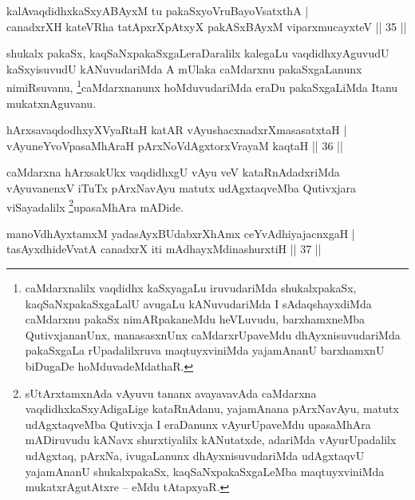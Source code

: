 
\begin{shl}
kalAvaqdidhxkaSxyABAyxM tu pakaSxyoVruBayoVsatxthA |\\
canadxrXH kateVRha tatApxrXpAtxyX pakASxBAyxM viparxmucayxteV \hfill || 35 ||
\end{shl}

\begin{artha}
shukalx pakaSx, kaqSaNxpakaSxgaLeraDaralilx kalegaLu vaqdidhxyAguvudU kaSxyisuvudU kANuvudariMda A mUlaka caMdarxnu pakaSxgaLanunx nimiRsuvanu, \footnote[1]{caMdarxnalilx vaqdidhx kaSxyagaLu iruvudariMda shukalxpakaSx, kaqSaNxpakaSxgaLalU avugaLu kANuvudariMda I sAdaqshayxdiMda caMdarxnu pakaSx nimARpakaneMdu heVLuvudu, barxhamxneMba QutivxjananUnx, manasasxnUnx caMdarxrUpaveMdu dhAyxnisuvudariMda pakaSxgaLa rUpadalilxruva maqtuyxviniMda yajamAnanU barxhamxnU biDugaDe hoMduvadeMdathaR.}caMdarxnanunx hoMduvudariMda eraDu pakaSxgaLiMda Itanu mukatxnAguvanu.
\end{artha}


\begin{shl}
hArxsavaqdodhxyXVyaRtaH katAR vAyushacxnadxrXmasasatxtaH |\\
vAyuneYvoVpasaMhAraH pArxNoVdAgxtorxVrayaM kaqtaH \hfill || 36 ||
\end{shl}

\begin{artha}
caMdarxna hArxsakUkx vaqdidhxgU vAyu veV kataRnAdadxriMda vAyuvanenxV iTuTx pArxNavAyu matutx udAgxtaqveMba Qutivxjara viSayadalilx \footnote[2]{sUtArxtamxnAda vAyuvu tananx avayavavAda caMdarxna vaqdidhxkaSxyAdigaLige kataRnAdanu, yajamAnana pArxNavAyu, matutx udAgxtaqveMba Qutivxja I eraDanunx vAyurUpaveMdu upasaMhAra mADiruvudu kANavx shurxtiyalilx kANutatxde, adariMda vAyurUpadalilx udAgxtaq, pArxNa, ivugaLanunx dhAyxnisuvudariMda udAgxtaqvU yajamAnanU shukalxpakaSx, kaqSaNxpakaSxgaLeMba maqtuyxviniMda mukatxrAgutAtxre -- eMdu tAtapxyaR.}upasaMhAra mADide.
\end{artha}


\begin{shl}
manoV\s dhAyxtamxM yadasAyxBUdabxrXhAmx ceYvAdhiyajacnxgaH |\\
tasAyxdhideVvatA canadxrX iti mAdhayxMdinashurxtiH \hfill || 37 ||
\end{shl}


